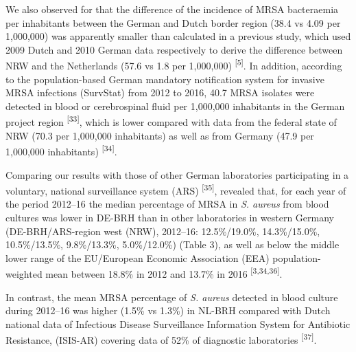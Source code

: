 \documentclass[
]{book}
\begin{document}
We also observed for that the difference of the incidence of MRSA bacteraemia per inhabitants between the German and Dutch border region (38.4 vs 4.09 per 1,000,000) was apparently smaller than calculated in a previous study, which used 2009 Dutch and 2010 German data respectively to derive the difference between NRW and the Netherlands (57.6 vs 1.8 per 1,000,000) \textsuperscript{{[}5{]}}. In addition, according to the population-based German mandatory notification system for invasive MRSA infections (SurvStat) from 2012 to 2016, 40.7 MRSA isolates were detected in blood or cerebrospinal fluid per 1,000,000 inhabitants in the German project region \textsuperscript{{[}33{]}}, which is lower compared with data from the federal state of NRW (70.3 per 1,000,000 inhabitants) as well as from Germany (47.9 per 1,000,000 inhabitants) \textsuperscript{{[}34{]}}.

Comparing our results with those of other German laboratories participating in a voluntary, national surveillance system (ARS) \textsuperscript{{[}35{]}}, revealed that, for each year of the period 2012--16 the median percentage of MRSA in \emph{S. aureus} from blood cultures was lower in DE-BRH than in other laboratories in western Germany (DE-BRH/ARS-region west (NRW), 2012--16: 12.5\%/19.0\%, 14.3\%/15.0\%, 10.5\%/13.5\%, 9.8\%/13.3\%, 5.0\%/12.0\%) (Table 3), as well as below the middle lower range of the EU/European Economic Association (EEA) population-weighted mean between 18.8\% in 2012 and 13.7\% in 2016 \textsuperscript{{[}3,34,36{]}}.

In contrast, the mean MRSA percentage of \emph{S. aureus} detected in blood culture during 2012--16 was higher (1.5\% vs 1.3\%) in NL-BRH compared with Dutch national data of Infectious Disease Surveillance Information System for Antibiotic Resistance, (ISIS-AR) covering data of 52\% of diagnostic laboratories \textsuperscript{{[}37{]}}.
\end{document}
